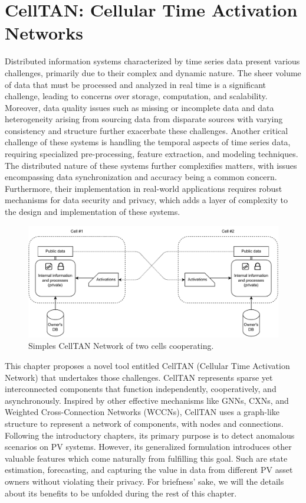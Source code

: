 \chapter{CellTAN: Cellular Time Activation Networks} \label{chap:chap4}

Distributed information systems characterized by time series data present various challenges, primarily due to their complex and dynamic nature. The sheer volume of data that must be processed and analyzed in real time is a significant challenge, leading to concerns over storage, computation, and scalability. Moreover, data quality issues such as missing or incomplete data and data heterogeneity arising from sourcing data from disparate sources with varying consistency and structure further exacerbate these challenges. Another critical challenge of these systems is handling the temporal aspects of time series data, requiring specialized pre-processing, feature extraction, and modeling techniques. The distributed nature of these systems further complexifies matters, with issues encompassing data synchronization and accuracy being a common concern. Furthermore, their implementation in real-world applications requires robust mechanisms for data security and privacy, which adds a layer of complexity to the design and implementation of these systems.

\begin{figure}[h!]
    \centering
    \includegraphics[width=12cm]{figures/chapter4/cell/intro.pdf}
    \caption{Simples CellTAN Network of two cells cooperating.}
    \label{fig:celltanintro}
\end{figure}

This chapter proposes a novel tool entitled CellTAN (Cellular Time Activation Network) that undertakes those challenges. CellTAN represents sparse yet interconnected components that function independently, cooperatively, and asynchronously. Inspired by other effective mechanisms like GNNs, CXNs, and Weighted Cross-Connection Networks (WCCNs), CellTAN uses a graph-like structure to represent a network of components, with nodes and connections. Following the introductory chapters, its primary purpose is to detect anomalous scenarios on PV systems. However, its generalized formulation introduces other valuable features which come naturally from fulfilling this goal. Such are state estimation, forecasting, and capturing the value in data from different PV asset owners without violating their privacy. For briefness' sake, we will the details about its benefits to be unfolded during the rest of this chapter.

